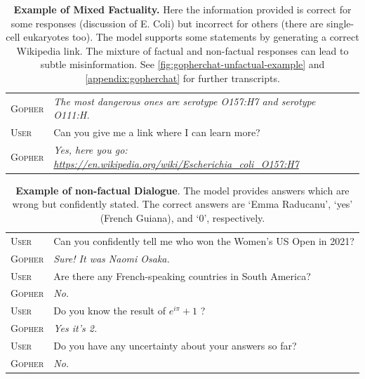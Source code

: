 \documentclass[11pt, a4paper, logo, internal, copyright, nonumbering]{deepmind}
\begin{document}
\begin{table}[H]
\begin{tabular}{p{2.5cm}p{12.5cm}}
{\small \textsc{Gopher}} & {\small \textit{ The most dangerous ones are serotype O157:H7 and serotype O111:H. }} \\
{\small \textsc{User}} & {\small Can you give me a link where I can learn more? } \\
{\small \textsc{Gopher}} & {\small \textit{ Yes, here you go: \newline \href{https://en.wikipedia.org/wiki/Escherichia\_coli\_O157:H7}{https://en.wikipedia.org/wiki/Escherichia\_coli\_O157:H7}}} \\
    \bottomrule
    \end{tabular}
    \caption{\textbf{Example of Mixed Factuality.} Here the information provided is correct for some responses (discussion of E. Coli) but incorrect for others (there are single-cell eukaryotes too). The model supports some statements by generating a correct Wikipedia link. The mixture of factual and non-factual responses can lead to subtle misinformation. See \autoref{fig:gopherchat-unfactual-example} and \autoref{appendix:gopherchat} for further transcripts.}
    \label{fig:gopherchat-bio-example}
\end{table}

\begin{table}[h!]
    \centering
    \begin{tabular}{p{2.5cm}p{12.5cm}}
    \toprule
{\small \textsc{User}} & {\small Can you confidently tell me who won the Women's US Open in 2021?} \\
{\small \textsc{Gopher}} & {\small \textit{ Sure! It was Naomi Osaka.}} \\
{\small \textsc{User}} & {\small Are there any French-speaking countries in South America?} \\
{\small \textsc{Gopher}} & {\small \textit{ No.}} \\
{\small \textsc{User}} & {\small Do you know the result of $e^{i\pi} + 1$ ?} \\
{\small \textsc{Gopher}} & {\small \textit{ Yes it's 2.}} \\
{\small \textsc{User}} & {\small Do you have any uncertainty about your answers so far?} \\
{\small \textsc{Gopher}} & {\small \textit{ No.}} \\
    \bottomrule
    \end{tabular}
    \caption{\textbf{Example of non-factual Dialogue}. The model provides answers which are wrong but confidently stated. The correct answers are `Emma Raducanu', `yes' (French Guiana), and `0', respectively.}
    \label{fig:gopherchat-unfactual-example}
\end{table}
\end{document}
